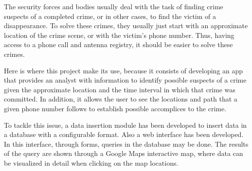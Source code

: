 The security forces and bodies usually deal with the task of finding crime suspects of a completed crime, or in other cases, to find the victim of a disappearance.
To solve these crimes, they usually just start with an approximate location of the crime scene, or with the victim's phone number.
Thus, having access to a phone call and antenna registry, it should be easier to solve these crimes.


Here is where this project make its use, because it consists of developing an app that provides an analyst with information to identify possible suspects of a crime given the approximate location and the time interval in which that crime was committed.
In addition, it allows the user to see the locations and path that a given phone number follows to establish possible accomplices to the crime.

To tackle this issue, a data insertion module has been developed to insert data in a database with a configurable format. 
Also a web interface has been developed. In this interface, through forms, queries in the database may be done.
The results of the query are shown through a Google Maps interactive map, where data can be visualized in detail when clicking on the map locations.


